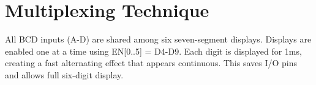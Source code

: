 \section{Multiplexing Technique}
All BCD inputs (A-D) are shared among six seven-segment displays. Displays are enabled one at a time using EN[0..5] = D4-D9. Each digit is displayed for 1ms, creating a fast alternating effect that appears continuous. This saves I/O pins and allows full six-digit display.


